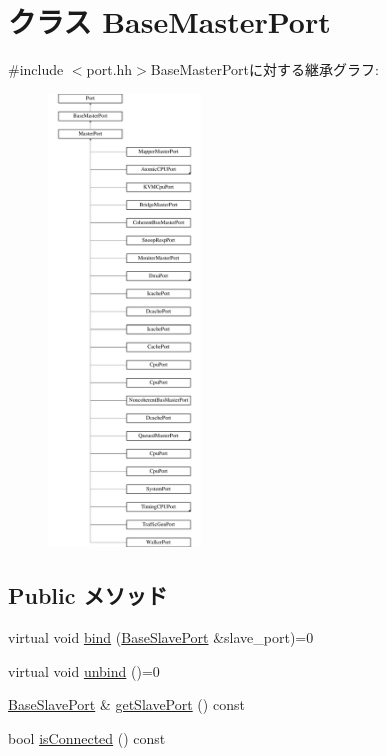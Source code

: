 \hypertarget{classBaseMasterPort}{
\section{クラス BaseMasterPort}
\label{classBaseMasterPort}
}


{\ttfamily \#include $<$port.hh$>$}BaseMasterPortに対する継承グラフ:\begin{figure}[H]
\begin{center}
\leavevmode
\includegraphics[height=12cm]{classBaseMasterPort}
\end{center}
\end{figure}
\subsection*{Public メソッド}
\begin{DoxyCompactItemize}
\item 
virtual void \hyperlink{classBaseMasterPort_a55647ab861a1f8cf8d26df2f402188d7}{bind} (\hyperlink{classBaseSlavePort}{BaseSlavePort} \&slave\_\-port)=0
\item 
virtual void \hyperlink{classBaseMasterPort_a406c5430a4a46c0068050632b9d3e765}{unbind} ()=0
\item 
\hyperlink{classBaseSlavePort}{BaseSlavePort} \& \hyperlink{classBaseMasterPort_a557fc10dd63c603dbcb8304d845dd077}{getSlavePort} () const 
\item 
bool \hyperlink{classBaseMasterPort_a180fa55a4bf36580963bed9e3e09c227}{isConnected} () const 
\end{DoxyCompactItemize}
